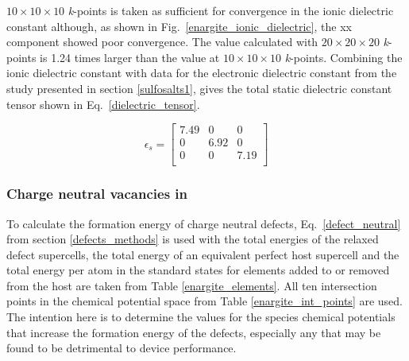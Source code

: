 \documentclass[11pt, twoside]{report}
\begin{document}
$10\times10\times10$ \textit{k}-points is taken as sufficient for convergence in the ionic dielectric constant although, as shown in Fig.~\ref{enargite_ionic_dielectric}, the xx component showed poor convergence. The value calculated with $20\times20\times20$ \textit{k}-points is 1.24 times larger than the value at $10\times10\times10$ \textit{k}-points. Combining the ionic dielectric constant with data for the electronic dielectric constant from the study presented in section \ref{sulfosalts1}, gives the total static dielectric constant tensor shown in Eq.~\ref{dielectric_tensor}.

\begin{equation}\label{dielectric_tensor}
\epsilon_s = 
\begin{bmatrix}
7.49 & 0 & 0 \\
0 & 6.92 & 0 \\
0 & 0 & 7.19 \\
\end{bmatrix}
\end{equation}

\subsubsection{Charge neutral vacancies in {\enargite}}
To calculate the formation energy of charge neutral defects, Eq.~\ref{defect_neutral} from section \ref{defects_methods} is used with the total energies of the relaxed defect supercells, the total energy of an equivalent perfect host supercell and the total energy per atom in the standard states for elements added to or removed from the host are taken from Table \ref{enargite_elements}. All ten intersection points in the chemical potential space from Table \ref{enargite_int_points} are used. The intention here is to determine the values for the species chemical potentials that increase the formation energy of the defects, especially any that may be found to be detrimental to device performance.
\end{document}
